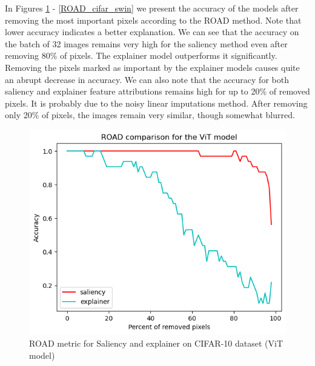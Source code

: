 \documentclass[en]{pracamgr}
\begin{document}
In Figures \ref{ROAD_cifar_vit} - \ref{ROAD_cifar_swin} we present the accuracy of the models after removing the most important pixels according to the ROAD method. Note that lower accuracy indicates a better explanation. We can see that the accuracy on the batch of 32 images remains very high for the saliency method even after removing 80\% of pixels. The explainer model outperforms it significantly. Removing the pixels marked as important by the explainer models causes quite an abrupt decrease in accuracy. We can also note that the accuracy for both saliency and explainer feature attributions remains high for up to 20\% of removed pixels. It is probably due to the noisy linear imputations method. After removing only 20\% of pixels, the images remain very similar, though somewhat blurred.



\begin{figure}[H]
\centering
\includegraphics[scale=0.5]{./images/ROAD_cifar_vit.png}
\caption{ROAD metric for Saliency and explainer on CIFAR-10 dataset (ViT model)}
\label{ROAD_cifar_vit}
\end{figure}
\end{document}
